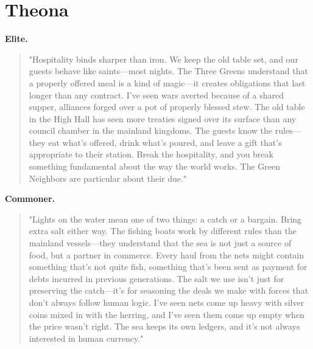 \section*{Theona}
\textbf{Elite.}
\begin{quote}
"Hospitality binds sharper than iron. We keep the old table set, and our guests behave like saints—most nights. The Three Greens understand that a properly offered meal is a kind of magic—it creates obligations that last longer than any contract. I've seen wars averted because of a shared supper, alliances forged over a pot of properly blessed stew. The old table in the High Hall has seen more treaties signed over its surface than any council chamber in the mainland kingdoms. The guests know the rules—they eat what's offered, drink what's poured, and leave a gift that's appropriate to their station. Break the hospitality, and you break something fundamental about the way the world works. The Green Neighbors are particular about their due."
\end{quote}
\textbf{Commoner.}
\begin{quote}
"Lights on the water mean one of two things: a catch or a bargain. Bring extra salt either way. The fishing boats work by different rules than the mainland vessels—they understand that the sea is not just a source of food, but a partner in commerce. Every haul from the nets might contain something that's not quite fish, something that's been sent as payment for debts incurred in previous generations. The salt we use isn't just for preserving the catch—it's for seasoning the deals we make with forces that don't always follow human logic. I've seen nets come up heavy with silver coins mixed in with the herring, and I've seen them come up empty when the price wasn't right. The sea keeps its own ledgers, and it's not always interested in human currency."
\end{quote}

